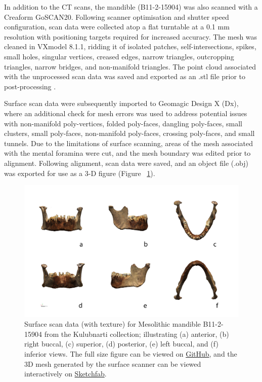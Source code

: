 \documentclass[review]{elsarticle}
\begin{document}
In addition to the CT scans, the mandible (B11-2-15904) was also scanned with a Creaform GoSCAN20. Following scanner optimisation and shutter speed configuration, scan data were collected atop a flat turntable at a 0.1 mm resolution with positioning targets required for increased accuracy. The mesh was cleaned in VXmodel 8.1.1, ridding it of isolated patches, self-intersections, spikes, small holes, singular vertices, creased edges, narrow triangles, outcropping triangles, narrow bridges, and non-manifold triangles. The point cloud associated with the unprocessed scan data was saved and exported as an .stl file prior to post-processing \citep{RN5585}. 

Surface scan data \citep{RN5931,RN5924} were subsequently imported to Geomagic Design X (Dx), where an additional check for mesh errors was used to address potential issues with non-manifold poly-vertices, folded poly-faces, dangling poly-faces, small clusters, small poly-faces, non-manifold poly-faces, crossing poly-faces, and small tunnels. Due to the limitations of surface scanning, areas of the mesh associated with the mental foramina were cut, and the mesh boundary was edited prior to alignment. Following alignment, scan data were saved, and an object file (.obj) was exported for use as a 3-D figure (Figure ~\ref{fig:Fig2}).

\begin{figure}[ht]\centering
\includegraphics[width=\linewidth]{Fig1}
\caption{Surface scan data (with texture) for Mesolithic mandible B11-2-15904 from the Kulubnarti collection; illustrating (a) anterior, (b) right buccal, (c) superior, (d) posterior, (e) left buccal, and (f) inferior views. The full size figure can be viewed on \href{https://github.com/aksel-blaise/cai.mandible/blob/main/figures/Fig1.png}{GitHub}, and the 3D mesh generated by the surface scanner can be viewed interactively on \href{https://skfb.ly/on9Zs}{Sketchfab}.}
\label{fig:Fig2}
\end{figure}
\end{document}
